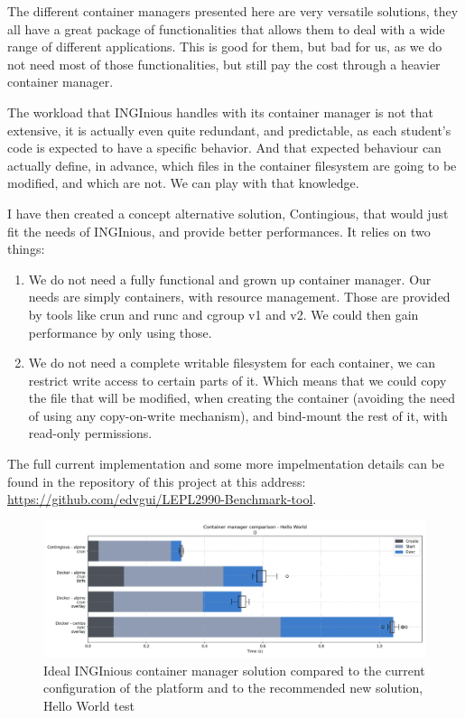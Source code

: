 The different container managers presented here are very versatile solutions, they all have a great package of functionalities that allows them to deal with a wide range of different applications.  This is good for them, but bad for us, as we do not need most of those functionalities, but still pay the cost through a heavier container manager.

The workload that INGInious handles with its container manager is not that extensive, it is actually even quite redundant, and predictable, as each student's code is expected to have a specific behavior.  And that expected behaviour can actually define, in advance, which files in the container filesystem are going to be modified, and which are not.  We can play with that knowledge.

I have then created a concept alternative solution, Contingious, that would just fit the needs of INGInious, and provide better performances.  It relies on two things:
\begin{enumerate}
  \item We do not need a fully functional and grown up container manager. Our needs are simply containers, with resource management.  Those are provided by tools like crun and runc and cgroup v1 and v2.  We could then gain performance by only using those.
  \item We do not need a complete writable filesystem for each container, we can restrict write access to certain parts of it.  Which means that we could copy the file that will be modified, when creating the container (avoiding the need of using any copy-on-write mechanism), and bind-mount the rest of it, with read-only permissions.
\end{enumerate}

The full current implementation and some more impelmentation details can be found in the repository of this project at this address: \href{https://github.com/edvgui/LEPL2990-Benchmark-tool}{https://github.com/edvgui/LEPL2990-Benchmark-tool}.

\begin{figure}[h!]
  \begin{center}
    \includegraphics[width=\linewidth]{images/question-2-hello-world.png}
    \caption{Ideal INGInious container manager solution compared to the current configuration of the platform and to the recommended new solution, Hello World test}
    \label{fig:q2:hello-world}
  \end{center}
\end{figure}

